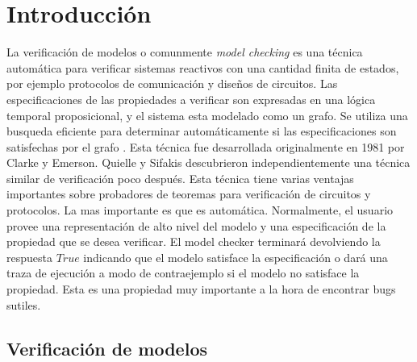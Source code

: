 \chapter{Introducción}
La verificación de modelos o comunmente \emph{model checking} es una técnica automática para verificar sistemas reactivos con una cantidad finita de estados, por ejemplo protocolos de comunicación y diseños de circuitos. Las especificaciones de las propiedades a verificar son expresadas en una lógica temporal proposicional, y el sistema esta modelado como un grafo. Se utiliza una busqueda eficiente para determinar automáticamente si las especificaciones son satisfechas por el grafo \cite{Clarke:5}. Esta técnica fue desarrollada originalmente en 1981 por Clarke y Emerson. Quielle y Sifakis descubrieron independientemente una técnica similar de verificación poco después.
Esta técnica tiene varias ventajas importantes sobre probadores de teoremas para verificación de circuitos y protocolos. La mas importante es que es automática. Normalmente, el usuario provee una representación de alto nivel del modelo y una especificación de la propiedad que se desea verificar. El model checker terminará devolviendo la respuesta $True$ indicando que el modelo satisface la especificación o dará una traza de ejecución a modo de contraejemplo si el modelo no satisface la propiedad. Esta es una propiedad muy importante a la hora de encontrar bugs sutiles.

\section{Verificación de modelos}

